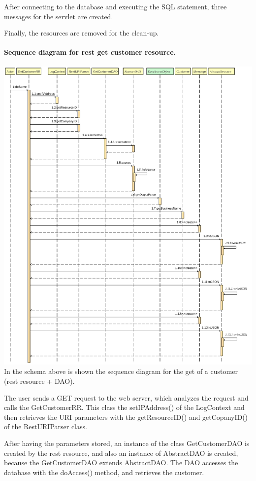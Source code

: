 After connecting to the database and executing the SQL statement, three messages for the servlet are created.

Finally, the resources are removed for the clean-up.
\pagebreak
\paragraph[]{Sequence diagram for rest get customer resource.} \hspace{1mm} \par
\includegraphics[width=\textwidth, keepaspectratio]{resources/getcustomersequence.pdf}
In the schema above is shown the sequence diagram for the get of a customer (rest resource + DAO). 

The user sends a GET request to the web server, which analyzes the request and calls the GetCustomerRR. This class the setIPAddress() of the LogContext and then retrieves the URI parameters with the getResourceID() and getCopanyID() of the RestURIParser class.

After having the parameters stored, an instance of the class GetCustomerDAO is created by the rest resource, and also an instance of AbstractDAO is created, because the GetCustomerDAO extends AbstractDAO. The DAO accesses the database with the doAccess() method, and retrieves the customer.

